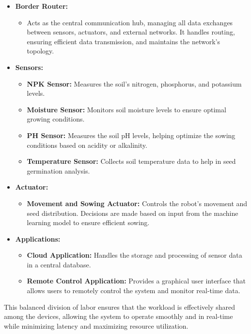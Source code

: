 \begin{itemize} 
    \item \textbf{Border Router:} 
    \begin{itemize} 
        \item Acts as the central communication hub, managing all data exchanges between sensors, actuators, and external networks. It handles routing, ensuring efficient data transmission, and maintains the network's topology.
    \end{itemize} 
    \item \textbf{Sensors:} 
    \begin{itemize} 
        \item \textbf{NPK Sensor:} Measures the soil's nitrogen, phosphorus, and potassium levels. 
        \item \textbf{Moisture Sensor:} Monitors soil moisture levels to ensure optimal growing conditions. 
        \item \textbf{PH Sensor:} Measures the soil pH levels, helping optimize the sowing conditions based on acidity or alkalinity. 
        \item \textbf{Temperature Sensor:} Collects soil temperature data to help in seed germination analysis. 
    \end{itemize} \item \textbf{Actuator:} 
    \begin{itemize} \item \textbf{Movement and Sowing Actuator:} Controls the robot’s movement and seed distribution. Decisions are made based on input from the machine learning model to ensure efficient sowing. 
    \end{itemize} \item \textbf{Applications:} 
    \begin{itemize} \item \textbf{Cloud Application:} Handles the storage and processing of sensor data in a central database. 
        \item \textbf{Remote Control Application:} Provides a graphical user interface that allows users to remotely control the system and monitor real-time data. 
    \end{itemize} 
\end{itemize}

This balanced division of labor ensures that the workload is effectively shared among the devices, allowing the system to operate smoothly and in real-time while minimizing latency and maximizing resource utilization.